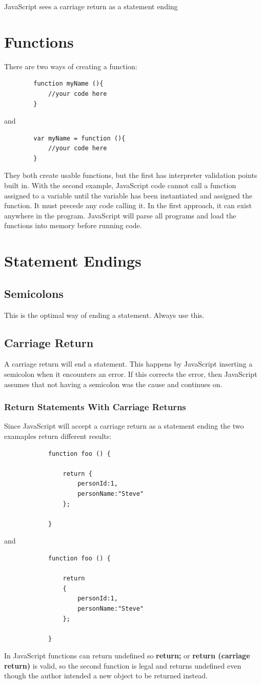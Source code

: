\documentclass {amsart}
\begin{document}
		JavaScript sees a carriage return as a statement ending

\section {Functions}
	There are two ways of creating a function:

	\begin{lstlisting}
		function myName (){
			//your code here
		}
	\end{lstlisting}

	and 

	\begin{lstlisting}
		var myName = function (){
			//your code here
		}
	\end{lstlisting}

	They both create usable functions, but the first has interpreter validation points built in.  With the second example, JavaScript code cannot call a function assigned to a variable until the variable has been instantiated and assigned the function.  
It must precede any code calling it.  In the first approach, it can exist anywhere in the program.  JavaScript will parse all programs and load the functions into memory before running code.  


\section{Statement Endings}
	\subsection{Semicolons}
		This is the optimal way of ending a statement.  Always use this.
	\subsection {Carriage Return}
		A carriage return will end a statement.  This happens by JavaScript inserting a semicolon when it encounters an error.  If this corrects the error, then JavaScript assumes that not having a semicolon was the cause and continues on. 
	\subsubsection {Return Statements With Carriage Returns}
		Since JavaScript will accept a carriage return as a statement ending the two examaples return different results: 
		\begin{lstlisting}
			function foo () {

				return {
					personId:1,
					personName:"Steve"
				};

			}
		\end{lstlisting}
		and
		\begin{lstlisting}
			function foo () {

				return 
				{
					personId:1,
					personName:"Steve"
				};

			}
		\end{lstlisting}
	In JavaScript functions can return undefined so {\bf return;} or {\bf return (carriage return)} is valid, so the second function is legal and returns undefined even though the author intended a new object to be returned instead.
\end{document}
